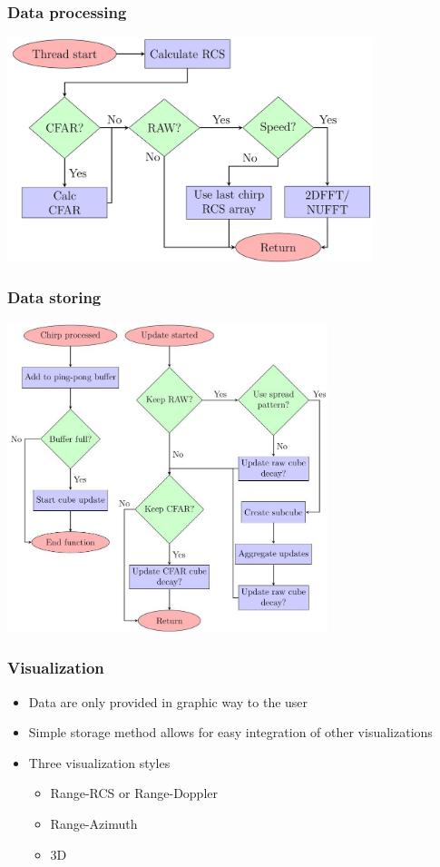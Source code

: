 \documentclass[aspectratio=43]{beamer}
\begin{document}
\begin{frame}[fragile]
  \frametitle{Data processing}
  \begin{center}
    \includegraphics[width=0.8\textwidth]{../img/dataflow_2.jpg}
  \end{center}
\end{frame}

\begin{frame}[fragile]
  \frametitle{Data storing}
  \begin{center}
    \includegraphics[width=0.7\textwidth]{../img/dataflow_3.jpg}
  \end{center}
\end{frame}

\begin{frame}[fragile]
  \frametitle{Visualization}
  \begin{itemize}
		\item Data are only provided in graphic way to the user
		\item Simple storage method allows for easy integration of other visualizations
    \item Three visualization styles
      \begin{itemize}
        \item Range-RCS or Range-Doppler
        \item Range-Azimuth
        \item 3D
      \end{itemize}
  \end{itemize}
\end{frame}
\end{document}
